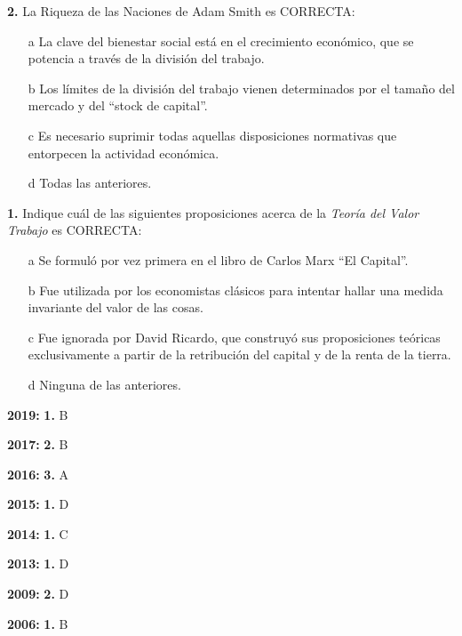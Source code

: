 \documentclass{nuevotema}
\begin{document}
\textbf{2.} La Riqueza de las Naciones de Adam Smith es CORRECTA:
\begin{itemize}
	\item[a] La clave del bienestar social está en el crecimiento económico, que se potencia a través de la división del trabajo.
	\item[b] Los límites de la división del trabajo vienen determinados por el tamaño del mercado y del ``stock de capital''. 
	\item[c] Es necesario suprimir todas aquellas disposiciones normativas que entorpecen la actividad económica.
	\item[d] Todas las anteriores.
\end{itemize}

\textbf{1.} Indique cuál de las siguientes proposiciones acerca de la \textit{Teoría del Valor Trabajo} es CORRECTA:

\begin{itemize}
	\item[a] Se formuló por vez primera en el libro de Carlos Marx ``El Capital''.
	\item[b] Fue utilizada por los economistas clásicos para intentar hallar una medida invariante del valor de las cosas.
	\item[c] Fue ignorada por David Ricardo, que construyó sus proposiciones teóricas exclusivamente a partir de la retribución del capital y de la renta de la tierra.
	\item[d] Ninguna de las anteriores.
\end{itemize}

\notas

\textbf{2019:} \textbf{1.} B 

\textbf{2017:} \textbf{2.} B

\textbf{2016:} \textbf{3.} A

\textbf{2015:} \textbf{1.} D

\textbf{2014:} \textbf{1.} C

\textbf{2013:} \textbf{1.} D

\textbf{2009:} \textbf{2.} D

\textbf{2006:} \textbf{1.} B

\bibliografia
\end{document}
